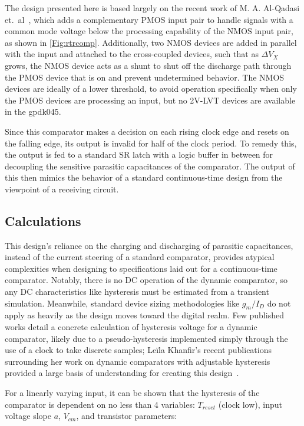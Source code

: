 \documentclass[11pt,letterpaper]{article}
\begin{document}
The design presented here is based largely on the recent work of M. A. Al-Qadasi et.\ al~\cite{Qadasi2020}, which adds a complementary PMOS input pair to handle signals with a common mode voltage below the processing capability of the NMOS input pair, as shown in \cref{Fig:rtrcomp}. Additionally, two NMOS devices are added in parallel with the input and attached to the cross-coupled devices, such that as \(\Delta V_X\) grows, the NMOS device acts as a shunt to shut off the discharge path through the PMOS device that is on and prevent undetermined behavior. The NMOS devices are ideally of a lower threshold, to avoid operation specifically when only the PMOS devices are processing an input, but no 2V-LVT devices are available in the gpdk045.

Since this comparator makes a decision on each rising clock edge and resets on the falling edge, its output is invalid for half of the clock period. To remedy this, the output is fed to a standard SR latch with a logic buffer in between for decoupling the sensitive parasitic capacitances of the comparator. The output of this then mimics the behavior of a standard continuous-time design from the viewpoint of a receiving circuit.

\subsection{Calculations}

This design's reliance on the charging and discharging of parasitic capacitances, instead of the current steering of a standard comparator, provides atypical complexities when designing to specifications laid out for a continuous-time comparator. Notably, there is no DC operation of the dynamic comparator, so any DC characteristics like hysteresis must be estimated from a transient simulation. Meanwhile, standard device sizing methodologies like \(g_m/I_D\) do not apply as heavily as the design moves toward the digital realm. Few published works detail a concrete calculation of hysteresis voltage for a dynamic comparator, likely due to a pseudo-hysteresis implemented simply through the use of a clock to take discrete samples; Leïla Khanfir's recent publications surrounding her work on dynamic comparators with adjustable hysteresis provided a large basis of understanding for creating this design~\cite{Khanfir2018,Khanfir2019,Khanfir2020_1,Khanfir2021}. 

For a linearly varying input, it can be shown that the hysteresis of the comparator is dependent on no less than 4 variables: \(T_{reset}\) (clock low), input voltage slope \(a\), \(V_{cm}\), and transistor parameters:
\end{document}
